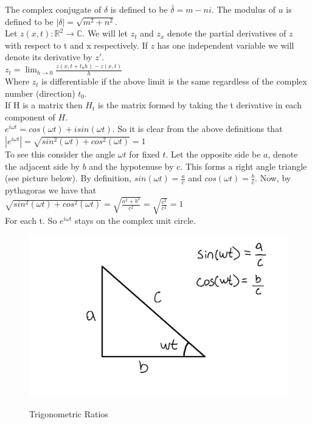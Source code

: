 \documentclass[12pt]{article}
\begin{document}
The complex 
conjugate of $\delta$ is defined to be $\bar{\delta}= m - ni$. 
The modulus of $u$ is defined to be $|\delta| = \sqrt{m^{2}+n^{2}}$.\\

Let $z(x,t): \mathbb{R}^{2} \rightarrow \mathbb{C}$. We will let $z_{t}$ and 
$z_{x}$ denote 
the partial derivatives of $z$ with respect to t and x respectively. If $z$ has 
one independent 
variable we will denote its derivative by $z'$. \\ 

$ z_{t} = \lim_{h \to 0 } \frac{z(x,t+ t_{0}h) - z(x,t)}{h}$ \\ 

Where $z_{t}$ is differentiable if the above limit is the same regardless of 
the complex number (direction) $t_{0}$. \\

If H is a matrix then $H_{t}$ 
is the 
matrix formed by taking the t derivative in each component of $H$.\\ 

$ e^{i \omega t} = cos(\omega t) + i sin(\omega t)$. So it is clear from the 
above definitions that \\

$ |e^{i \omega t}| = \sqrt{sin^{2} (\omega t) + cos^{2} (\omega t)} =1$ \\  

To see this consider the angle $\omega t$ for fixed $t$. Let the opposite side 
be $a$, denote 
the adjacent side by $b$ and the hypotenuse by $c$. This forms a right angle 
triangle (see picture below). By definition,  $sin(\omega t) = \frac{a}{c} $ 
and $ cos(\omega t) = \frac{b}{c} $. Now, by pythagoras we have that\\

$ \sqrt{sin^{2} (\omega t) + cos^{2} (\omega t)} = 
\sqrt{\frac{a^{2}+b^{2}}{c^{2}} } = \sqrt{ \frac{c^{2}}{c^{2} } }= 1 $ \\ 

For each t. So $e^{i \omega t}$ stays on the complex unit circle. \\

\begin{figure}[h!]
	\begin{center}
		{
			\includegraphics[width=\textwidth]{pytha.png}
		} 
	\caption{Trigonometric Ratios}
	\end{center}
\end{figure}
\end{document}
